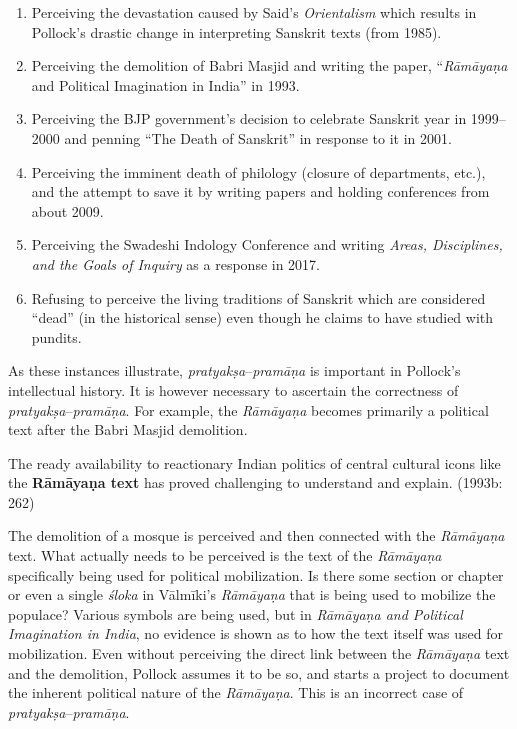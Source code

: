 \begin{enumerate}
\itemsep=0pt
\item Perceiving the devastation caused by Said’s \textit{Orientalism} which results in Pollock’s drastic change in interpreting Sanskrit texts (from 1985).

 \item Perceiving the demolition of Babri Masjid and writing the paper, “\textit{Rāmāyaṇa }and Political Imagination in India” in 1993.

 \item Perceiving the BJP government’s decision to celebrate Sanskrit year in 1999–2000 and penning “The Death of Sanskrit” in response to it in 2001.

 \item Perceiving the imminent death of philology (closure of departments, etc.), and the attempt to save it by writing papers and holding conferences from about 2009.

 \item Perceiving the Swadeshi Indology Conference and writing \textit{Areas, Disciplines, and the Goals of Inquiry} as a response in 2017.

 \item Refusing to perceive the living traditions of Sanskrit which are considered “dead” (in the historical sense) even though he claims to have studied with pundits.

\end{enumerate}

\vspace{-.3cm}

As these instances illustrate, \textit{pratyakṣa}–\textit{pramāṇa} is important in Pollock’s intellectual history. It is however necessary to ascertain the correctness of \textit{pratyakṣa}–\textit{pramāṇa}. For example, the \textit{Rāmāyaṇa} becomes primarily a political text after the Babri Masjid demolition.

\begin{myquote}
The ready availability to reactionary Indian politics of central cultural icons like the \textbf{Rāmāyaṇa text} has proved challenging to understand and explain. (1993b: 262)
\end{myquote}

The demolition of a mosque is perceived and then connected with the \textit{Rāmāyaṇa} text. What actually needs to be perceived is the text of the \textit{Rāmāyaṇa }specifically being used for political mobilization. Is there some section or chapter or even a single \textit{śloka} in Vālmīki’s \textit{Rāmāyaṇa} that is being used to mobilize the populace? Various symbols are being used, but in \textit{Rāmāyaṇa and Political Imagination in India}, no evidence is shown as to how the text itself was used for mobilization. Even without perceiving the direct link between the \textit{Rāmāyaṇa }text and the demolition, Pollock assumes it to be so, and starts a project to document the inherent political nature of the \textit{Rāmāyaṇa}. This is an incorrect case of \textit{pratyakṣa}–\textit{pramāṇa}.

